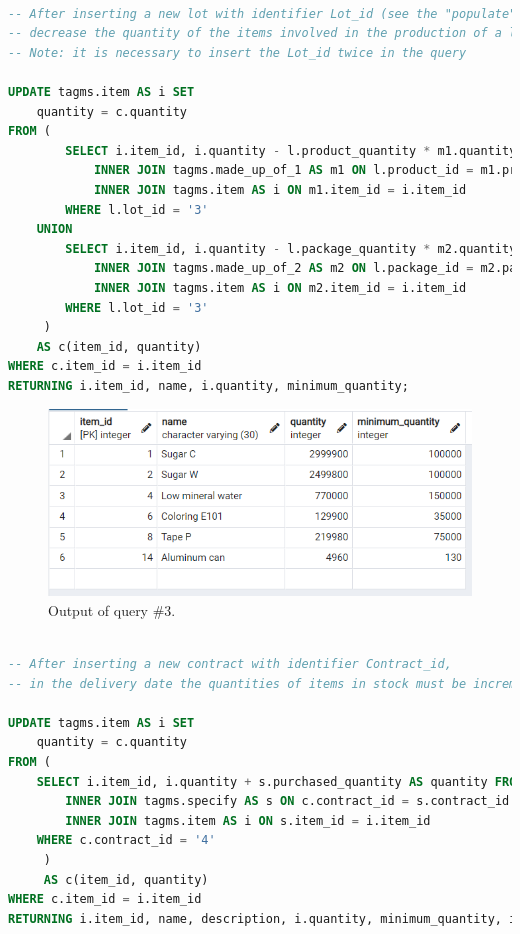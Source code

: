 \begin{lstlisting}[language=SQL,
	keywordstyle=\color{blue},
	stringstyle=\color{mauve},
	showstringspaces=false,
	breaklines=true,
	basicstyle=\ttfamily\footnotesize]

-- After inserting a new lot with identifier Lot_id (see the "populate" section)
-- decrease the quantity of the items involved in the production of a lot
-- Note: it is necessary to insert the Lot_id twice in the query

UPDATE tagms.item AS i SET
    quantity = c.quantity
FROM (
        SELECT i.item_id, i.quantity - l.product_quantity * m1.quantity AS quantity FROM tagms.lot AS l
            INNER JOIN tagms.made_up_of_1 AS m1 ON l.product_id = m1.product_id
            INNER JOIN tagms.item AS i ON m1.item_id = i.item_id
        WHERE l.lot_id = '3'
    UNION
        SELECT i.item_id, i.quantity - l.package_quantity * m2.quantity AS quantity FROM tagms.lot AS l
            INNER JOIN tagms.made_up_of_2 AS m2 ON l.package_id = m2.package_id
            INNER JOIN tagms.item AS i ON m2.item_id = i.item_id
        WHERE l.lot_id = '3'
     )
    AS c(item_id, quantity)
WHERE c.item_id = i.item_id
RETURNING i.item_id, name, i.quantity, minimum_quantity;


\end{lstlisting}

\begin{figure}[h!]
	\centering
	\includegraphics{images/q3}
	\caption{Output of query \#3.}
	\label{fig:q3}
\end{figure}

\begin{lstlisting}[language=SQL,
	keywordstyle=\color{blue},
	stringstyle=\color{mauve},
	showstringspaces=false,
	breaklines=true,
	basicstyle=\ttfamily\footnotesize]

-- After inserting a new contract with identifier Contract_id,
-- in the delivery date the quantities of items in stock must be incremented

UPDATE tagms.item AS i SET
    quantity = c.quantity
FROM (
    SELECT i.item_id, i.quantity + s.purchased_quantity AS quantity FROM tagms.contract AS c
        INNER JOIN tagms.specify AS s ON c.contract_id = s.contract_id
        INNER JOIN tagms.item AS i ON s.item_id = i.item_id
    WHERE c.contract_id = '4'
     )
     AS c(item_id, quantity)
WHERE c.item_id = i.item_id
RETURNING i.item_id, name, description, i.quantity, minimum_quantity, item_category_id;

\end{lstlisting}

